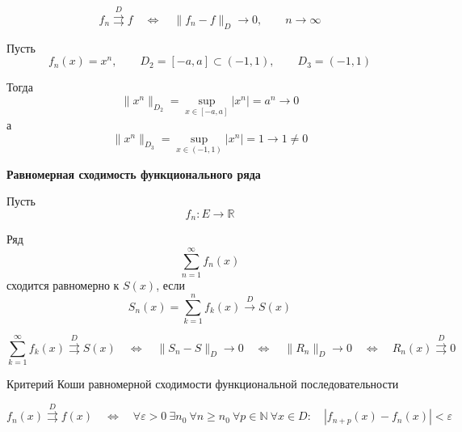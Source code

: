 \documentclass[12pt,a4paper]{article}
\begin{document}
\begin{note}

    \[
        f_n\overset{D}{\rightrightarrows}f
        \quad\Longleftrightarrow\quad
        \|f_n-f\|_D\longrightarrow0,
        \qquad n\to\infty
    \]

\end{note}

\begin{example}

    Пусть
    \[
        f_n(x)=x^n,
        \qquad
        D_2=[-a,a]\subset(-1,1),
        \qquad
        D_3=(-1,1)
    \]

    Тогда
    \[
        \|x^n\|_{D_2}
        =
        \sup_{x\in[-a,a]}|x^n|
        =
        a^n\longrightarrow0
    \]
    а
    \[
        \|x^n\|_{D_3}
        =
        \sup_{x\in(-1,1)}|x^n|
        =
        1\longrightarrow1\neq0
    \]

\end{example}

\begin{definition}

    \textbf{Равномерная сходимость функционального ряда}

    Пусть
    \[
        f_n\colon E\to\mathbb{R}
    \]

    Ряд
    \[
        \sum_{n=1}^{\infty}f_n(x)
    \]
    сходится равномерно к $S(x)$, если
    \[
        S_n(x)=\sum_{k=1}^{n}f_k(x)\xrightarrow{D}S(x)
    \]

\end{definition}

\begin{note}

    \[
        \sum_{k=1}^{\infty}f_k(x)\overset{D}{\rightrightarrows}S(x)
        \quad\Longleftrightarrow\quad
        \|S_n-S\|_D\longrightarrow0
        \quad\Longleftrightarrow\quad
        \|R_n\|_D\longrightarrow0
        \quad\Longleftrightarrow\quad
        R_n(x)\overset{D}{\rightrightarrows}0
    \]

\end{note}

\begin{theorem}{Критерий Коши равномерной сходимости функциональной последовательности}

    \[
        f_n(x)\overset{D}{\rightrightarrows}f(x)
        \quad\Longleftrightarrow\quad
        \forall\varepsilon>0\ \exists n_0\
        \forall n\geq n_0\
        \forall p\in\mathbb{N}\
        \forall x\in D:
        \quad
        |f_{n+p}(x)-f_n(x)|<\varepsilon
    \]

\end{theorem}
\end{document}
